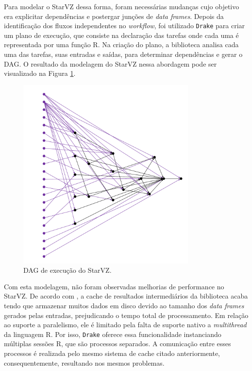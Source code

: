 Para modelar o StarVZ dessa forma, foram necessárias mudanças cujo objetivo era 
explicitar 
dependências e postergar junções de \emph{data frames}. Depois da identificação 
dos fluxos independentes    
no \emph{workflow}, foi utilizado \texttt{Drake} para criar um plano de 
execução, que consiste na declaração
das tarefas onde cada uma é representada por uma função R. Na criação do plano, 
a biblioteca analisa cada
uma das tarefas, suas entradas e saídas, para determinar dependências e gerar o 
DAG. O resultado da modelagem do
StarVZ nessa abordagem pode ser visualizado na Figura \ref{fig:starvz-dag}.

\begin{figure}[ht]
\centerline{
\includegraphics[width=0.8\textwidth]{./img/drake-dag-final-origin.pdf}}
 \caption{DAG de execução do StarVZ.}
 \label{fig:starvz-dag}
\end{figure}

Com esta modelagem, não foram observadas melhorias de performance no StarVZ. De 
acordo com \citet{ref:drakestarvz},
a cache de resultados intermediários da biblioteca acaba tendo que armazenar 
muitos dados em disco devido
ao tamanho dos \emph{data frames} gerados pelas entradas, prejudicando o tempo 
total de processamento.
Em relação ao suporte a paralelismo, ele é limitado pela falta de suporte 
nativo 
a \emph{multithread} da linguagem R.
Por isso, \texttt{Drake} oferece essa funcionalidade instanciando múltiplas 
sessões R, que são processos separados. A comunicação
entre esses processos é realizada pelo mesmo sistema de cache citado 
anteriormente, consequentemente, resultando nos mesmos
problemas.

